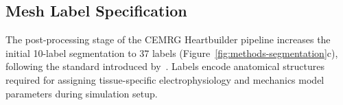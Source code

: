 %

\subsection*{Mesh Label Specification}

The post-processing stage of the CEMRG Heartbuilder pipeline increases the
initial 10-label segmentation to 37 labels
(Figure~\ref{fig:methods-segmentation}c), following the standard introduced
by~\cite{strocchi2020_cohort,strocchi2020_simulating}. Labels encode
anatomical structures required for assigning tissue-specific electrophysiology
and mechanics model parameters during simulation setup.

